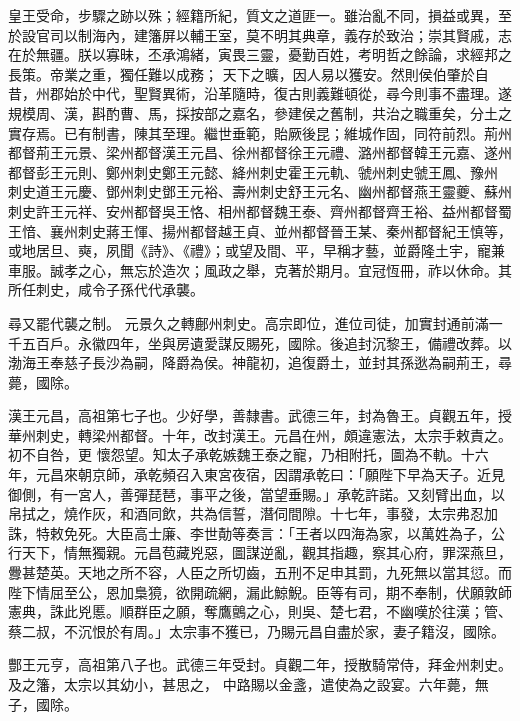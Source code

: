 \begin{pinyinscope}
 皇王受命，步驟之跡以殊；經籍所紀，質文之道匪一。雖治亂不同，損益或異，至於設官司以制海內，建籓屏以輔王室，莫不明其典章，義存於致治；崇其賢戚，志在於無疆。朕以寡昧，丕承鴻緒，寅畏三靈，憂勤百姓，考明哲之餘論，求經邦之長策。帝業之重，獨任難以成務；
 天下之曠，因人易以獲安。然則侯伯肇於自昔，州郡始於中代，聖賢異術，沿革隨時，復古則義難頓從，尋今則事不盡理。遂規模周、漢，斟酌曹、馬，採按部之嘉名，參建侯之舊制，共治之職重矣，分土之實存焉。已有制書，陳其至理。繼世垂範，貽厥後昆；維城作固，同符前烈。荊州都督荊王元景、梁州都督漢王元昌、徐州都督徐王元禮、潞州都督韓王元嘉、遂州都督彭王元則、鄭州刺史鄭王元懿、絳州刺史霍王元軌、虢州刺史虢王鳳、豫州
 刺史道王元慶、鄧州刺史鄧王元裕、壽州刺史舒王元名、幽州都督燕王靈夔、蘇州刺史許王元祥、安州都督吳王恪、相州都督魏王泰、齊州都督齊王裕、益州都督蜀王愔、襄州刺史蔣王惲、揚州都督越王貞、並州都督晉王某、秦州都督紀王慎等，或地居旦、奭，夙聞《詩》、《禮》；或望及間、平，早稱才藝，並爵隆土宇，寵兼車服。誠孝之心，無忘於造次；風政之舉，克著於期月。宜冠恆冊，祚以休命。其所任刺史，咸令子孫代代承襲。



 尋又罷代襲之制。
 元景久之轉鄜州刺史。高宗即位，進位司徒，加實封通前滿一千五百戶。永徽四年，坐與房遺愛謀反賜死，國除。後追封沉黎王，備禮改葬。以渤海王奉慈子長沙為嗣，降爵為侯。神龍初，追復爵土，並封其孫逖為嗣荊王，尋薨，國除。



 漢王元昌，高祖第七子也。少好學，善隸書。武德三年，封為魯王。貞觀五年，授華州刺史，轉梁州都督。十年，改封漢王。元昌在州，頗違憲法，太宗手敕責之。初不自咎，更
 懷怨望。知太子承乾嫉魏王泰之寵，乃相附托，圖為不軌。十六年，元昌來朝京師，承乾頻召入東宮夜宿，因謂承乾曰：「願陛下早為天子。近見御側，有一宮人，善彈琵琶，事平之後，當望垂賜。」承乾許諾。又刻臂出血，以帛拭之，燒作灰，和酒同飲，共為信誓，潛伺間隙。十七年，事發，太宗弗忍加誅，特敕免死。大臣高士廉、李世勣等奏言：「王者以四海為家，以萬姓為子，公行天下，情無獨親。元昌苞藏兇惡，圖謀逆亂，觀其指趣，察其心府，罪深燕旦，
 釁甚楚英。天地之所不容，人臣之所切齒，五刑不足申其罰，九死無以當其愆。而陛下情屈至公，恩加梟獍，欲開疏網，漏此鯨鯢。臣等有司，期不奉制，伏願敦師憲典，誅此兇慝。順群臣之願，奪鷹鸇之心，則吳、楚七君，不幽嘆於往漢；管、蔡二叔，不沉恨於有周。」太宗事不獲已，乃賜元昌自盡於家，妻子籍沒，國除。



 酆王元亨，高祖第八子也。武德三年受封。貞觀二年，授散騎常侍，拜金州刺史。及之籓，太宗以其幼小，甚思之，
 中路賜以金盞，遣使為之設宴。六年薨，無子，國除。




\end{pinyinscope}

